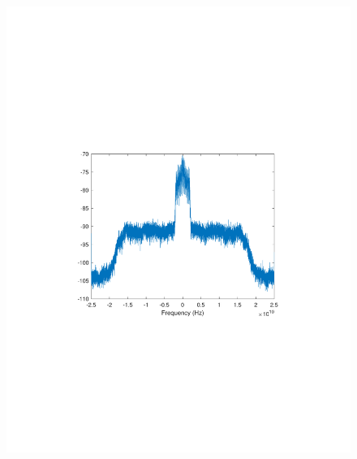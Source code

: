 \begin{refsection}
\begin{figure}[H]
	\centering
	\begin{minipage}{0.30\textwidth}
		\centering
		\includegraphics[clip, trim=4cm 8cm 4cm 8cm, width=1\textwidth]{./sdf/m_qam_system/figures/expResults/homodyne/0_4GBdInSig13dB_bfFec.pdf}
		\label{fig:4GBdEyeBefFecHm}
	\end{minipage}
	\begin{minipage}{0.30\textwidth}
		\centering

\end{minipage}
\end{figure}
\end{refsection}
